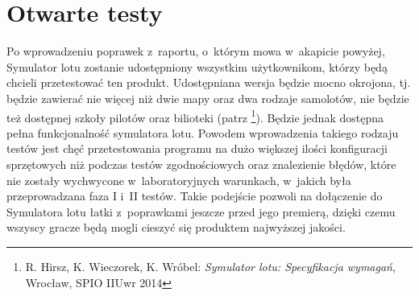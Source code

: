 \documentclass{mwrep}
\begin{document}
\section{Otwarte testy}
Po wprowadzeniu poprawek z~raportu, o~którym mowa w~akapicie powyżej, Symulator lotu zostanie udostępniony wszystkim użytkownikom, którzy będą chcieli przetestować ten produkt. Udostępniana wersja będzie mocno okrojona, tj. będzie zawierać nie więcej niż dwie mapy oraz dwa rodzaje samolotów, nie będzie też dostępnej szkoły pilotów oraz bilioteki (patrz \footnote{R. Hirsz, K. Wieczorek, K. Wróbel: \textit{Symulator lotu: Specyfikacja wymagań}, Wrocław, SPIO IIUwr 2014}). Będzie jednak dostępna pełna funkcjonalność symulatora lotu. Powodem wprowadzenia takiego rodzaju testów jest chęć przetestowania programu na dużo większej ilości konfiguracji sprzętowych niż podczas testów zgodnościowych oraz znalezienie błędów, które nie zostały wychwycone w~laboratoryjnych warunkach, w~jakich była przeprowadzana faza I i~II testów. Takie podejście pozwoli na dołączenie do Symulatora lotu łatki z~poprawkami jeszcze przed jego premierą, dzięki czemu wszyscy gracze będą mogli cieszyć się produktem najwyższej jakości.
\end{document}
